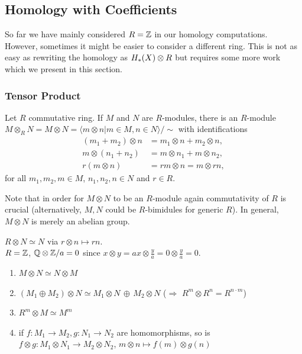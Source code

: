 \documentclass[a4paper,11pt]{article}
\begin{document}
		\subsection{Homology with Coefficients}
			So far we have mainly considered $R=\mathbb{Z}$ in our homology computations. However, sometimes it might be easier to consider a different ring. This is not as easy as rewriting the homology as $H_{\ast}(X)\otimes R$ but requires some more work which we present in this section.

			\subsubsection*{Tensor Product}
				Let $R$ commutative ring. If $M$ and $N$ are $R$-modules, there is an $R$-module $M\otimes_RN=M\otimes N=\langle m\otimes n|m\in M,n\in N\rangle/\sim$ with identifications
				\begin{align*}
					(m_1+m_2)\otimes n&=m_1\otimes n+m_2\otimes n,\\
					m\otimes(n_1+n_2)&=m\otimes n_1+m\otimes n_2,\\
					r(m\otimes n)&=rm\otimes n=m\otimes rn,
				\end{align*}
				for all $m_1,m_2,m\in M$, $n_1,n_2,n\in N$ and $r\in R$.
				\begin{remark}
					Note that in order for $M\otimes N$ to be an $R$-module again commutativity of $R$ is crucial (alternatively, $M,N$ could be $R$-bimidules for generic $R$). In general, $M\otimes N$ is merely an abelian group.
				\end{remark}

				\begin{eg}
					$R\otimes N\simeq N$ via $r\otimes n\mapsto rn$. \\$R=\mathbb{Z}$, $\mathbb{Q}\otimes\mathbb{Z}/a=0$ since $x\otimes y=ax\otimes\frac{y}{a}=0\otimes\frac{y}{a}=0$.
				\end{eg}

				\begin{enumerate}
					\item $M\otimes N\simeq N\otimes M$
					\item $(M_1\oplus M_2)\otimes N\simeq M_1\otimes N\,\oplus\,M_2\otimes N$ ($\Longrightarrow$ $R^m\otimes R^n=R^{n\cdot m}$)
					\item $R^m\otimes M\simeq M^m$
					\item if $f:M_1\rightarrow M_2, g:N_1\rightarrow N_2$ are homomorphisms, so is $f\otimes g:M_1\otimes N_1\rightarrow M_2\otimes N_2$, $m\otimes n\mapsto f(m)\otimes g(n)$
				\end{enumerate}
\end{document}

